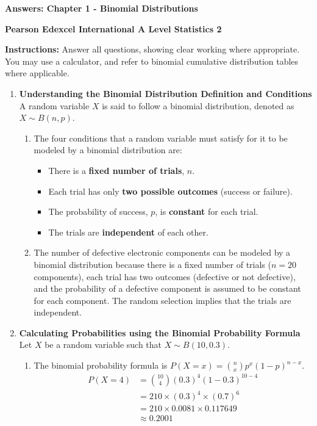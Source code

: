 \documentclass[12pt]{article}
\begin{document}
\centerline{\Large\textbf{Answers: Chapter 1 - Binomial Distributions}}
\centerline{\textbf{Pearson Edexcel International A Level Statistics 2}}
\vspace{0.5cm}

\textbf{Instructions:} Answer all questions, showing clear working where appropriate. You may use a calculator, and refer to binomial cumulative distribution tables where applicable.

\vspace{0.5cm}

\begin{enumerate}
    \item \textbf{Understanding the Binomial Distribution Definition and Conditions}
    A random variable $X$ is said to follow a binomial distribution, denoted as $X \sim B(n, p)$.
    \begin{enumerate}
        \item The four conditions that a random variable must satisfy for it to be modeled by a binomial distribution are:
        \begin{itemize}
            \item There is a \textbf{fixed number of trials}, $n$.
            \item Each trial has only \textbf{two possible outcomes} (success or failure).
            \item The probability of success, $p$, is \textbf{constant} for each trial.
            \item The trials are \textbf{independent} of each other.
        \end{itemize}

        \item The number of defective electronic components can be modeled by a binomial distribution because there is a fixed number of trials ($n=20$ components), each trial has two outcomes (defective or not defective), and the probability of a defective component is assumed to be constant for each component. The random selection implies that the trials are independent.
    \end{enumerate}

    \item \textbf{Calculating Probabilities using the Binomial Probability Formula}
    Let $X$ be a random variable such that $X \sim B(10, 0.3)$.
    \begin{enumerate}
        \item The binomial probability formula is $P(X=x) = \binom{n}{x} p^x (1-p)^{n-x}$.
        \begin{align*}
        P(X=4) &= \binom{10}{4} (0.3)^4 (1-0.3)^{10-4} \\
        &= 210 \times (0.3)^4 \times (0.7)^6 \\
        &= 210 \times 0.0081 \times 0.117649 \\
        &\approx 0.2001
        \end{align*}


\end{enumerate}
\end{enumerate}
\end{document}
